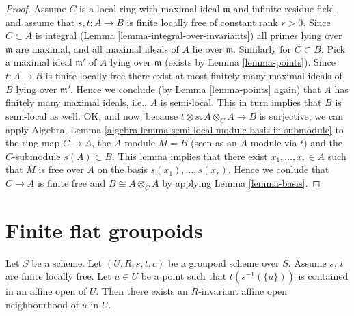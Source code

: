 \begin{proof}
\medskip\noindent
Assume $C$ is a local ring with maximal ideal $\mathfrak m$ and
infinite residue field, and assume that $s, t : A \to B$ is
finite locally free of constant rank $r > 0$.
Since $C \subset A$ is integral (Lemma \ref{lemma-integral-over-invariants})
all primes lying over $\mathfrak m$ are maximal, and all maximal
ideals of $A$ lie over $\mathfrak m$. Similarly for $C \subset B$.
Pick a maximal ideal $\mathfrak m'$
of $A$ lying over $\mathfrak m$ (exists by Lemma \ref{lemma-points}).
Since $t : A \to B$ is finite locally free there exist at most finitely
many maximal ideals of $B$ lying over $\mathfrak m'$. Hence we conclude
(by Lemma \ref{lemma-points} again)
that $A$ has finitely many maximal ideals, i.e.,
$A$ is semi-local. This in turn implies that $B$ is semi-local as
well. OK, and now, because $t \otimes s : A \otimes_C A \to B$ is surjective,
we can apply
Algebra, Lemma \ref{algebra-lemma-semi-local-module-basis-in-submodule}
to the ring map $C \to A$, the $A$-module $M = B$ (seen as an $A$-module
via $t$) and the $C$-submodule $s(A) \subset B$. This lemma implies that there
exist $x_1, \ldots, x_r \in A$ such that $M$ is free over $A$
on the basis $s(x_1), \ldots, s(x_r)$. Hence we conlude that $C \to A$
is finite free and $B \cong A \otimes_C A$ by applying
Lemma \ref{lemma-basis}.
\end{proof}



\section{Finite flat groupoids}
\label{section-finite-flat-general}

\begin{lemma}
\label{lemma-find-invariant-affine}
Let $S$ be a scheme.
Let $(U, R, s, t, c)$ be a groupoid scheme over $S$.
Assume $s$, $t$ are finite locally free.
Let $u \in U$ be a point such that $t(s^{-1}(\{u\}))$
is contained in an affine open of $U$.
Then there exists an $R$-invariant affine open neighbourhood
of $u$ in $U$.
\end{lemma}

